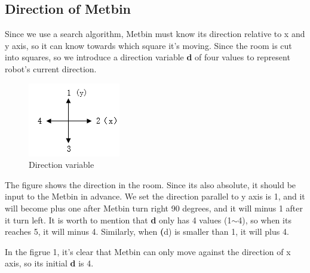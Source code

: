 \documentclass[12pt]{article}
\begin{document}
\subsection{Direction of Metbin}
Since we use a search algorithm, Metbin must know its direction relative to x and y axis, so it can know towards which square it's moving. Since the room is cut into squares, so we introduce a direction variable \textbf{d} of four values to represent robot's current direction. 
\begin{figure}[H]
\centering
\includegraphics[scale=1]{P2.jpg}
\caption{Direction variable}
\end{figure}
The figure shows the direction in the room. Since its also absolute, it should be input to the Metbin in advance. We set the direction parallel to y axis is 1, and it will become plus one after Metbin turn right 90 degrees, and it will minus 1 after it turn left. It is worth to mention that \textbf{d} only has 4 values (1$\sim$4), so when its reaches 5, it will minus 4.
Similarly, when \textbf(d) is smaller than 1, it will plus 4.
\par In the figrue 1, it's clear that Metbin can only move against the direction of x axis, so its initial \textbf{d} is 4.
\end{document}
